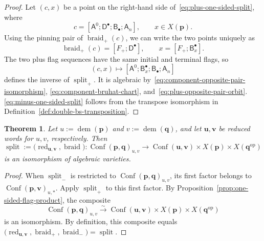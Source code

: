 \documentclass[10pt,a4paper]{article}
\newtheorem{theorem}{Theorem}[section]
\theoremstyle{definition}
\theoremstyle{remark}
\newcommand{\flagA}{\mathsf{A}}
\newcommand{\flagB}{\mathsf{B}}
\newcommand{\flagD}{\mathsf{D}}
\newcommand{\Conf}{\operatorname{Conf}}
\newcommand{\Split}{\operatorname{split}}
\begin{document}
\begin{proof}
Let \((c,x)\) be a point on the right-hand side
of~\eqref{eq:plus-one-sided-split}, where
\[
 c=[\flagA^0;\flagD^\bullet;\flagB_\bullet;\flagA_n],
 \qquad x\in X(\mathbf p).
\]
Using the pinning pair of \(\operatorname{braid}_+(c)\), we can write the two
points uniquely as
\[
 \operatorname{braid}_+(c)=[F_+;\flagD^\bullet],
 \qquad
 x=[F_+;\flagB_x^\bullet].
\]
The two plus flag sequences have the same initial and terminal flags, so
\[
 (c,x)\longmapsto
 [\flagA^0;\flagB_x^\bullet;\flagB_\bullet;\flagA_n]
\]
defines the inverse of \(\Split_+\).  It is algebraic
by~\eqref{eq:component-opposite-pair-isomorphism},
\eqref{eq:component-bruhat-chart}, and~\eqref{eq:plus-opposite-pair-orbit}.
\eqref{eq:minus-one-sided-split} follows from the transpose
isomorphism in Definition~\ref{def:double-bs-transposition}.
\end{proof}

\begin{theorem}
\label{thm:flag-product}
Let \(u:=\operatorname{dem}(\mathbf p)\) and
\(v:=\operatorname{dem}(\mathbf q)\), and let \(\mathbf u,\mathbf v\) be
reduced words for \(u,v\), respectively.  Then
\begin{equation}
 \Split
 :=
 \bigl(
  \operatorname{red}_{\mathbf u,\mathbf v},
  \operatorname{braid}
 \bigr):
 \Conf(\mathbf p,\mathbf q)_{u,v}
 \longrightarrow
 \Conf(\mathbf u,\mathbf v)
 \times X(\mathbf p)\times X(\mathbf q^{\mathrm{op}})
 \label{eq:double-split-definition}
\end{equation}
is an isomorphism of algebraic varieties.
\end{theorem}

\begin{proof}
When \(\Split_-\) is restricted to \(\Conf(\mathbf p,\mathbf q)_{u,v}\), its
first factor belongs to \(\Conf(\mathbf p,\mathbf v)_{u,*}\).  Apply
\(\Split_+\) to this first factor.  By
Proposition~\ref{prop:one-sided-flag-product}, the composite
\[
 \Conf(\mathbf p,\mathbf q)_{u,v}
 \xrightarrow{\sim}
 \Conf(\mathbf u,\mathbf v)
 \times X(\mathbf p)\times X(\mathbf q^{\mathrm{op}})
\]
is an isomorphism.  By definition, this composite equals
\(\bigl(\operatorname{red}_{\mathbf u,\mathbf v},
\operatorname{braid}_+,\operatorname{braid}_-\bigr)=\Split\).
\end{proof}
\end{document}
